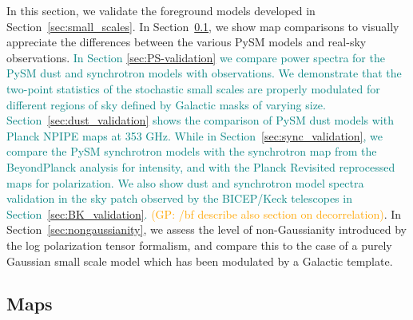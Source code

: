 \documentclass[twocolumn]{aastex631}
\newcommand{\giuse}[1]{\textcolor{orange}{(GP: #1)}}
\newcommand{\sg}[1]{\textcolor{teal}{#1}}
\begin{document}
In this section, we validate the foreground models developed in Section~\ref{sec:small_scales}.
%
In Section~\ref{subsec:maps}, we show map comparisons to visually appreciate the differences between the various PySM models and real-sky observations.
%
%
\sg{In Section \ref{sec:PS-validation} we compare power spectra for the PySM dust and synchrotron models with observations. We demonstrate that the two-point statistics of the stochastic small scales are properly modulated for different regions of sky defined by Galactic masks of varying size. Section~\ref{sec:dust_validation} shows the comparison of PySM dust models with Planck NPIPE maps at 353 GHz. 
While in Section~\ref{sec:sync_validation}, we compare the PySM synchrotron models with the synchrotron map from the BeyondPlanck analysis for intensity, and with the Planck Revisited reprocessed maps for polarization. We also show dust and synchrotron model spectra validation in the sky patch observed by the BICEP/Keck telescopes in Section~\ref{sec:BK_validation}.}
%
\giuse{/bf describe also section on decorrelation}. In Section~\ref{sec:nongaussianity}, we assess the level of non-Gaussianity introduced by the log polarization tensor formalism, and compare this to the case of a purely Gaussian small scale model which has been modulated by a Galactic template. 


\subsection{Maps}\label{subsec:maps}

\end{document}
